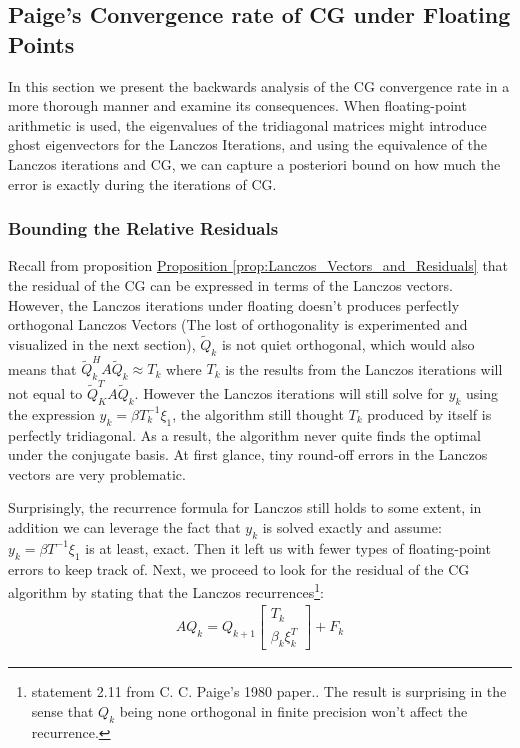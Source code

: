 \documentclass[]{article}
\theoremstyle{definition}
\begin{document}
    \subsection{Paige's Convergence rate of CG under Floating Points}
        In this section we present the backwards analysis of the CG convergence rate in a more thorough manner and examine its consequences. When floating-point arithmetic is used, the eigenvalues of the tridiagonal matrices might introduce ghost eigenvectors for the Lanczos Iterations, and using the equivalence of the Lanczos iterations and CG, we can capture a posteriori bound on how much the error is exactly during the iterations of CG. 
        \subsubsection{Bounding the Relative Residuals}
            Recall from proposition \hyperref[prop:Lanczos_Vectors_and_Residuals]{Proposition \ref*{prop:Lanczos_Vectors_and_Residuals}} that the residual of the CG can be expressed in terms of the Lanczos vectors. However, the Lanczos iterations under floating doesn't produces perfectly orthogonal Lanczos Vectors (The lost of orthogonality is experimented and visualized in the next section), $\tilde{Q}_k$ is not quiet orthogonal, which would also means that $\tilde{Q}_k^HA\tilde{Q}_k\approx T_k$ where $T_k$ is the results from the Lanczos iterations will not equal to $\tilde{Q}^T_KA\tilde{Q}_k$. However the Lanczos iterations will still solve for $y_k$ using the expression $y_k = \beta T^{-1}_k\xi_1$, the algorithm still thought $T_k$ produced by itself is perfectly tridiagonal. As a result, the algorithm never quite finds the optimal under the conjugate basis. At first glance, tiny round-off errors in the Lanczos vectors are very problematic. 
            \par
            Surprisingly, the recurrence formula for Lanczos still holds to some extent, in addition we can leverage the fact that $y_k$ is solved exactly and assume: $y_k = \beta T^{-1}\xi_1$ is at least, exact. Then it left us with fewer types of floating-point errors to keep track of. Next, we proceed to look for the residual of the CG algorithm by stating that the Lanczos recurrences\footnote{statement 2.11 from C. C. Paige's 1980 paper.\cite{paper:paige1980}. The result is surprising in the sense that $Q_k$ being none orthogonal in finite precision won't affect the recurrence.}: 
            \begin{align}
                AQ_k = Q_{k + 1} \begin{bmatrix}
                    T_k
                    \\
                    \beta_k \xi_k^T
                \end{bmatrix} + F_k
            \end{align}
\end{document}
